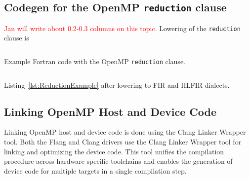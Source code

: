 \documentclass[acmtog,natbib=false]{acmart}
\newcommand{\todo}[1]{\textcolor{red}{#1}}
\newcommand{\code}[1]{\texttt{#1}\xspace}
\begin{document}



\subsection{Codegen for the OpenMP \code{reduction} clause}
\label{sec:OpenMPReduction}
\todo{Jan will write about 0.2-0.3 columns on this topic.}
Lowering of the \code{reduction} clause is 


\begin{listing}[t]
\inputminted{Fortran}{code/tgt_reduction.f90}
\caption{Example Fortran code with the OpenMP \code{reduction} clause.}
\label{lst:ReductionExample}
\end{listing}

\begin{listing}[t]
\inputminted{MLIR-lexer.py:MlirLexer -x}{code/tgt_reduction_abridged.fir}
\caption{Listing~\ref{lst:ReductionExample} after lowering to \acs{FIR} and \acs{HLFIR} dialects.}
\label{lst:MLIRReductionExample}
\end{listing}

\subsection{Linking OpenMP Host and Device Code}
\label{sec:LinkingOpenMPHostandDeviceCode}
Linking OpenMP host and device code is done using the Clang Linker Wrapper tool.
Both the Flang and Clang drivers use the Clang Linker Wrapper tool for linking and optimizing the device code.
This tool unifies the compilation procedure across hardware-specific toolchains and enables the generation of device code for multiple targets in a single compilation step.
\end{document}
